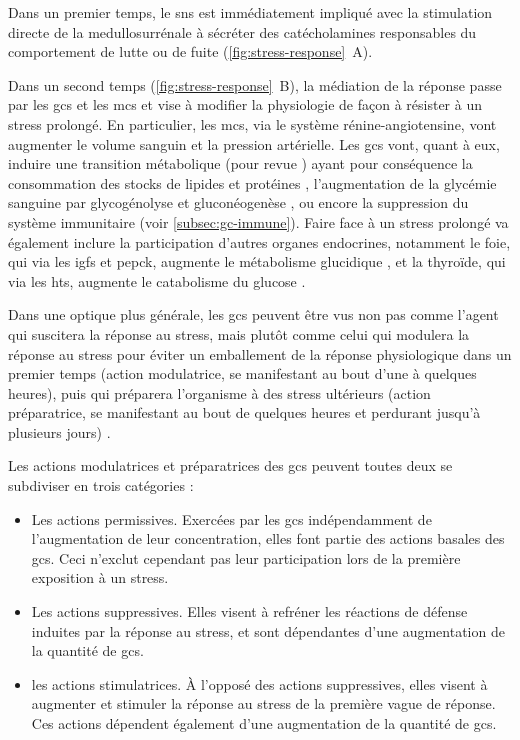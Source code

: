 \documentclass[../main.tex]{subfiles}
\begin{document}
		Dans un premier temps, le \gls{sns} est immédiatement impliqué avec la stimulation directe de la medullosurrénale à sécréter des catécholamines responsables du comportement de lutte ou de fuite (\autoref{fig:stress-response}~A).
		\par
		Dans un second temps (\autoref{fig:stress-response}~B), la médiation de la réponse passe par les \glspl{gc} et les \glspl{mc} et vise à modifier la physiologie de façon à résister à un stress prolongé.
		En particulier, les \glspl{mc}, via le système rénine-angiotensine, vont augmenter le volume sanguin et la pression artérielle.
		Les \glspl{gc} vont, quant à eux, induire une transition métabolique (pour revue \citealp{Munck2010,Weissman1990}) ayant pour conséquence la consommation des stocks de lipides et protéines \citep{Richard1993}, l'augmentation de la glycémie sanguine par glycogénolyse et gluconéogenèse \citep{Eigler1979}, ou encore la suppression du système immunitaire (voir \autoref{subsec:gc-immune}).
		Faire face à un stress prolongé va également inclure la participation d'autres organes endocrines, notamment le foie, qui via les \glspl{igf} et \gls{pepck}, augmente le métabolisme glucidique \citep{Exton1987,Weissman1990}, et la thyroïde, qui via les \glspl{ht}, augmente le catabolisme du glucose \citep{Weissman1990}.
		\par
		Dans une optique plus générale, les \glspl{gc} peuvent être vus non pas comme l'agent qui suscitera la réponse au stress, mais plutôt comme celui qui modulera la réponse au stress pour éviter un emballement de la réponse physiologique dans un premier temps (action modulatrice, se manifestant au bout d'une à quelques heures), puis qui préparera l'organisme à des stress ultérieurs (action préparatrice, se manifestant au bout de quelques heures et perdurant jusqu'à plusieurs jours) \citet{Sapolsky2000}.
		\par
		Les actions modulatrices et préparatrices des \glspl{gc} peuvent toutes deux se subdiviser en trois catégories :
		\begin{itemize}
			\item
				Les actions permissives. Exercées par les \glspl{gc} indépendamment de l'augmentation de leur concentration, elles font partie des actions basales des \glspl{gc}.
				Ceci n'exclut cependant pas leur participation lors de la première exposition à un stress.
			\item
				Les actions suppressives. Elles visent à refréner les réactions de défense induites par la réponse au stress, et sont dépendantes d'une augmentation de la quantité de \glspl{gc}.
			\item
				les actions stimulatrices. À l'opposé des actions suppressives, elles visent à augmenter et stimuler la réponse au stress de la première vague de réponse.
				Ces actions dépendent également d'une augmentation de la quantité de \glspl{gc}.
		\end{itemize}
\end{document}
